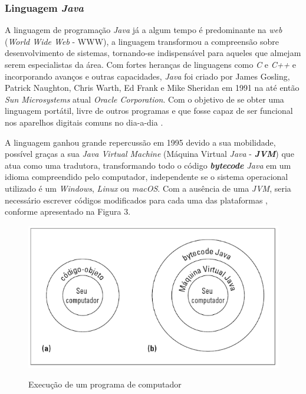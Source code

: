 \subsubsection{Linguagem \textit{Java}}
A linguagem de programação \textit{Java} já a algum tempo é predominante na \textit{web} (\textit{World Wide Web} - WWW), a linguagem transformou a compreensão sobre desenvolvimento de sistemas, tornando-se indispensável para aqueles que almejam serem especialistas da área. Com fortes heranças de linguagens como \textit{C} e \textit{C++} e incorporando avanços e outras capacidades, \textit{Java} foi criado por James Gosling, Patrick Naughton, Chris Warth, Ed Frank e Mike Sheridan em 1991 na até então \textit{Sun Microsystems} atual \textit{Oracle Corporation}. Com o objetivo de se obter uma linguagem portátil, livre de outros programas e que fosse capaz de ser funcional nos aparelhos digitais comuns no dia-a-dia \cite{Herbert}.

A linguagem ganhou grande repercussão em 1995 devido a sua mobilidade, possível graças a sua \textit{Java Virtual Machine} (Máquina Virtual \textit{Java} - \textbf{\textit{JVM}}) que atua como uma tradutora, transformando todo o código \textit{\textbf{bytecode} \textit{Java}} em um idioma compreendido pelo computador, independente se o sistema operacional utilizado é um \textit{Windows}, \textit{Linux} ou \textit{macOS}. Com a ausência de uma \textit{JVM}, seria necessário escrever códigos modificados para cada uma das plataformas \cite{Burd}, conforme apresentado na Figura 3.

\FloatBarrier
\begin{figure}[!htbp]
	\centering
		\caption{Execução de um programa de computador}
	\includegraphics[scale=0.5]{imagens/JVM}
	\label{fig:figura3}
\end{figure}
\FloatBarrier

